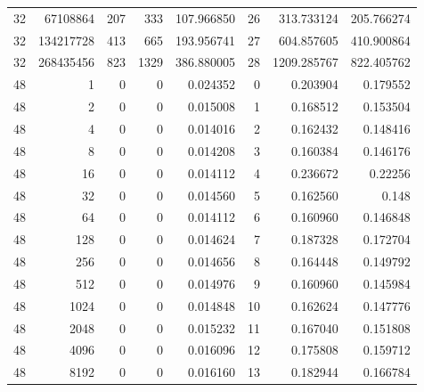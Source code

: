 \begin{longtable}[c]{@{}rrrrrrrr@{}}
    32        & 67108864  & 207       & 333      & 107.966850  & 26                  & 313.733124  & 205.766274 \\
    32        & 134217728 & 413       & 665      & 193.956741  & 27                  & 604.857605  & 410.900864 \\
    32        & 268435456 & 823       & 1329     & 386.880005  & 28                  & 1209.285767 & 822.405762 \\
    48        & 1         & 0         & 0        & 0.024352    & 0                   & 0.203904    & 0.179552   \\
    48        & 2         & 0         & 0        & 0.015008    & 1                   & 0.168512    & 0.153504   \\
    48        & 4         & 0         & 0        & 0.014016    & 2                   & 0.162432    & 0.148416   \\
    48        & 8         & 0         & 0        & 0.014208    & 3                   & 0.160384    & 0.146176   \\
    48        & 16        & 0         & 0        & 0.014112    & 4                   & 0.236672    & 0.22256    \\
    48        & 32        & 0         & 0        & 0.014560    & 5                   & 0.162560    & 0.148      \\
    48        & 64        & 0         & 0        & 0.014112    & 6                   & 0.160960    & 0.146848   \\
    48        & 128       & 0         & 0        & 0.014624    & 7                   & 0.187328    & 0.172704   \\
    48        & 256       & 0         & 0        & 0.014656    & 8                   & 0.164448    & 0.149792   \\
    48        & 512       & 0         & 0        & 0.014976    & 9                   & 0.160960    & 0.145984   \\
    48        & 1024      & 0         & 0        & 0.014848    & 10                  & 0.162624    & 0.147776   \\
    48        & 2048      & 0         & 0        & 0.015232    & 11                  & 0.167040    & 0.151808   \\
    48        & 4096      & 0         & 0        & 0.016096    & 12                  & 0.175808    & 0.159712   \\
    48        & 8192      & 0         & 0        & 0.016160    & 13                  & 0.182944    & 0.166784   \\

\end{longtable}
